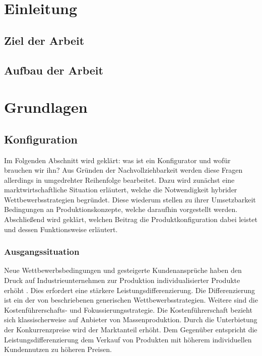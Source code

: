 \documentclass[12pt,a4paper,bibliography=totocnumbered,listof=totoc]{scrartcl}
\begin{document}













\section{Einleitung}

\subsection{Ziel der Arbeit}

\subsection{Aufbau der Arbeit}

\pagebreak

\section{Grundlagen}

\subsection{Konfiguration}
Im Folgenden Abschnitt wird geklärt: was ist ein Konfigurator und wofür brauchen wir ihn? Aus Gründen der Nachvollziehbarkeit werden diese Fragen allerdings in umgedrehter Reihenfolge bearbeitet.
Dazu wird zunächst eine marktwirtschaftliche Situation erläutert, welche die Notwendigkeit hybrider Wettbewerbsstrategien begründet. Diese wiederum stellen zu ihrer Umsetzbarkeit Bedingungen an Produktionskonzepte, welche daraufhin vorgestellt werden. Abschließend wird geklärt, welchen Beitrag die Produktkonfiguration dabei leistet und dessen Funktionsweise erläutert.

\subsubsection{Ausgangssituation}
 \label{subssubsection:Ausgangssituation}
Neue Wettbewerbsbedingungen und gesteigerte Kundenansprüche haben den Druck auf Industrieunternehmen zur Produktion individualisierter Produkte erhöht \citep{piller98}. Dies erfordert eine stärkere Leistungsdifferenzierung\citep{lutz11}. Die Differenzierung ist ein der von \citeauthor{porter02} beschriebenen \glqq generischen Wettbewerbsstrategien\grqq{}. Weitere sind die Kostenführerschafts- und Fokussierungsstrategie. Die Kostenführerschaft bezieht sich klassischerweise auf Anbieter von Massenproduktion. Durch die Unterbietung der Konkurrenzpreise wird der Marktanteil erhöht. Dem Gegenüber entspricht die Leistungsdifferenzierung dem Verkauf von Produkten mit höherem individuellen Kundennutzen zu höheren Preisen.
\end{document}
